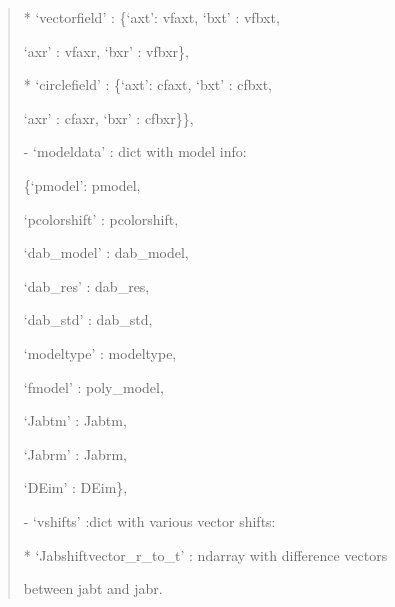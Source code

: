 \documentclass[letterpaper,10pt,english]{sphinxmanual}
\begin{document}
\begin{fulllineitems}
\begin{description}
\begin{quote}
\begin{description}
\begin{DUlineblock}{0em}
\begin{DUlineblock}{\DUlineblockindent}
\begin{DUlineblock}{\DUlineblockindent}
\begin{DUlineblock}{\DUlineblockindent}
\item[] * ‘vectorfield’ : \{‘axt’: vfaxt, ‘bxt’ : vfbxt, 
\item[]
\begin{DUlineblock}{\DUlineblockindent}
\item[] ‘axr’ : vfaxr, ‘bxr’ : vfbxr\},
\end{DUlineblock}
\item[] * ‘circlefield’ : \{‘axt’: cfaxt, ‘bxt’ : cfbxt, 
\item[]
\begin{DUlineblock}{\DUlineblockindent}
\item[] ‘axr’ : cfaxr, ‘bxr’ : cfbxr\}\},
\end{DUlineblock}
\end{DUlineblock}
\end{DUlineblock}
\item[] - ‘modeldata’ : dict with model info:
\item[]
\begin{DUlineblock}{\DUlineblockindent}
\item[] \{‘pmodel’: pmodel, 
\item[] ‘pcolorshift’ : pcolorshift, 
\item[]
\begin{DUlineblock}{\DUlineblockindent}
\item[] ‘dab\_model’ : dab\_model, 
\item[] ‘dab\_res’ : dab\_res,
\item[] ‘dab\_std’ : dab\_std,
\item[] ‘modeltype’ : modeltype, 
\item[] ‘fmodel’ : poly\_model,
\item[] ‘Jabtm’ : Jabtm, 
\item[] ‘Jabrm’ : Jabrm, 
\item[] ‘DEim’ : DEim\},
\end{DUlineblock}
\end{DUlineblock}
\item[] - ‘vshifts’ :dict with various vector shifts:
\item[]
\begin{DUlineblock}{\DUlineblockindent}
\item[] * ‘Jabshiftvector\_r\_to\_t’ : ndarray with difference vectors
\item[]
\begin{DUlineblock}{\DUlineblockindent}
\item[] between jabt and jabr.
\end{DUlineblock}

\end{DUlineblock}
\end{DUlineblock}
\end{DUlineblock}
\end{description}
\end{quote}
\end{description}
\end{fulllineitems}
\end{document}
